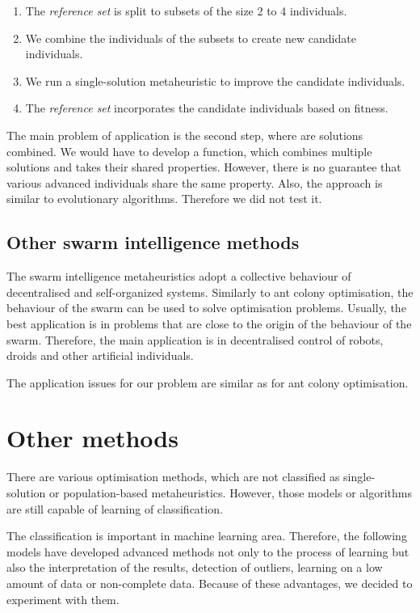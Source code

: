\documentclass[
  print, %
  Table,   %
  nolof,     %
  nolot,     %
  11pt, %
  oneside  %
]{fithesis3}
\begin{document}
\begin{enumerate}
    \item The \textit{reference set} is split to subsets of the size 2 to 4 individuals.
    \item We combine the individuals of the subsets to create new candidate individuals.
    \item We run a single-solution metaheuristic to improve the candidate individuals.
    \item The \textit{reference set} incorporates the candidate individuals based on fitness.
\end{enumerate}

The main problem of application is the second step, where are solutions combined. We would have to develop a function, which combines multiple solutions and takes their shared properties. However, there is no guarantee that various advanced individuals share the same property. Also, the approach is similar to evolutionary algorithms. Therefore we did not test it.

\subsection{Other swarm intelligence methods}
\label{subsec:opt-popul-si}

The swarm intelligence metaheuristics adopt a collective behaviour of decentralised and self-organized systems. Similarly to ant colony optimisation, the behaviour of the swarm can be used to solve optimisation problems. Usually, the best application is in problems that are close to the origin of the behaviour of the swarm. Therefore, the main application is in decentralised control of robots, droids and other artificial individuals.

The application issues for our problem are similar as for ant colony optimisation.


\section{Other methods}
\label{sec:opt-other}

There are various optimisation methods, which are not classified as single-solution or population-based metaheuristics. However, those models or algorithms are still capable of learning of classification.

The classification is important in machine learning area. Therefore, the following models have developed advanced methods not only to the process of learning but also the interpretation of the results, detection of outliers, learning on a low amount of data or non-complete data. Because of these advantages, we decided to experiment with them.
\end{document}
